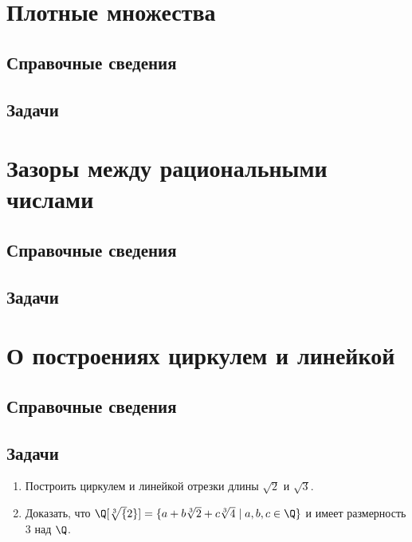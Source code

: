 \section{Плотные множества}

\subsection*{Справочные сведения}

\subsection*{Задачи}



\section{Зазоры между рациональными числами}

\subsection*{Справочные сведения}

\subsection*{Задачи}



\section{О построениях циркулем и линейкой}

\subsection*{Справочные сведения}

\subsection*{Задачи}

\begin{enumerate}
\item Построить циркулем и линейкой отрезки длины $\sqrt 2$ и $\sqrt 3$.
\item Доказать, что $\Q[\sqrt[3]{2}]=\{a+b\sqrt[3]{2}+c\sqrt[3]{4}\;|\;a,b,c\in\Q\}$ и имеет размерность 3 над $\Q$.
\end{enumerate}





